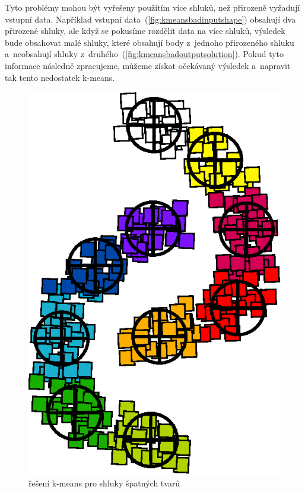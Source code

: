Tyto problémy mohou být vyřešeny použitím více shluků, než přirozeně vyžadují vstupní data. Například vstupní data~(\autoref{fig:kmeansbadinputshape}) obsahují dva přirozené shluky, ale když se pokusíme rozdělit data na více shluků, výsledek bude obsahovat malé shluky, které obsahují body z~jednoho přirozeného shluku a~neobsahují shluky z~druhého~(\autoref{fig:kmeansbadoutputsolution}). Pokud tyto informace následně zpracujeme, můžeme získat očekávaný výsledek a~napravit tak tento nedostatek k-means.
\begin{figure}[h]
  \centering
  \includegraphics[width=.3\textwidth]{img/kmeans_badOutputSampleShapeSolution.eps}
  \caption{řešení k-means pro shluky špatných tvarů}
  \label{fig:kmeansbadoutputsolution}
\end{figure}


